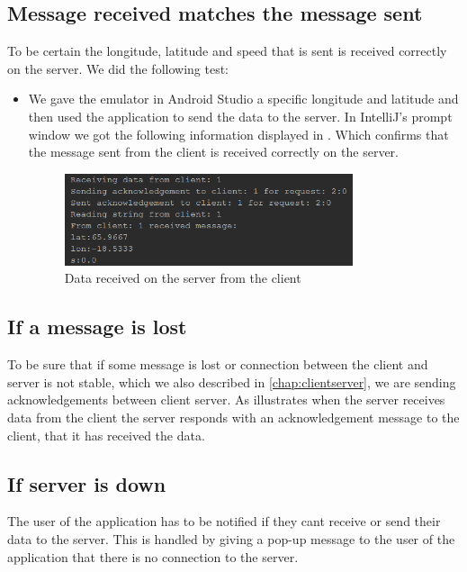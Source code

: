 \subsection{Message received matches the message sent}
To be certain the longitude, latitude and speed that is sent is received correctly on the server. We did the following test:
\begin{itemize}
	\item We gave the emulator in Android Studio a specific longitude and latitude and then used the application to send the data to the server. In IntelliJ's prompt window we got the following information displayed in . Which confirms that the message sent from the client is received correctly on the server.
	\begin{figure}[h!]
  \centering
    \includegraphics[width=0.8\textwidth]{figures/datasentfromclienttoserver.png}
    \caption{Data received on the server from the client}
    \label{fig:datasentfromclienttoserver}
\end{figure}
\end{itemize}

\subsection{If a message is lost}
To be sure that if some message is lost or connection between the client and server is not stable, which we also described in \autoref{chap:clientserver}, we are sending acknowledgements between client server. As   illustrates when the server receives data from the client the server responds with an acknowledgement message to the client, that it has received the data.

\subsection{If server is down}
The user of the application has to be notified if they cant receive or send their data to the server. This is handled by giving a pop-up message to the user of the application that there is no connection to the server.

